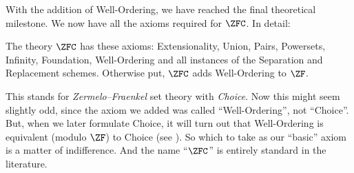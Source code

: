 \documentclass[../../../include/open-logic-section]{subfiles}
\begin{document}
With the addition of Well-Ordering, we have reached the final theoretical milestone. We now have all the axioms required for $\ZFC$. In detail:
\begin{defn}
	The theory $\ZFC$ has these axioms: Extensionality, Union, Pairs, Powersets, Infinity, Foundation, Well-Ordering and all instances of the Separation and Replacement schemes. Otherwise put, $\ZFC$ adds Well-Ordering to $\ZF$.
\end{defn}\noindent
This stands for \emph{Zermelo--Fraenkel} set theory with \emph{Choice}. Now this might seem slightly odd, since the axiom we added was called ``Well-Ordering'', not ``Choice''. But, when we later formulate {Choice}, it will turn out that Well-Ordering is equivalent (modulo $\ZF$) to Choice (see ). So which to take as our ``basic'' axiom is a matter of indifference. And the name ``$\ZFC$'' is entirely standard in the literature. 
\end{document}
